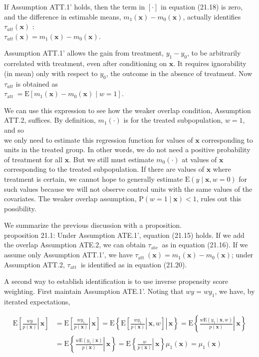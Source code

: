 \documentclass[10pt]{article}
\begin{document}
If Assumption ATT.1' holds, then the term in $[\cdot]$ in equation (21.18) is zero, and the difference in estimable means, $m_{1}(\mathbf{x})-m_{0}(\mathbf{x})$, actually identifies $\tau_{a t t}(\mathbf{x})$ :\\
$\tau_{a t t}(\mathbf{x})=m_{1}(\mathbf{x})-m_{0}(\mathbf{x})$.

Assumption ATT.1' allows the gain from treatment, $y_{1}-y_{0}$, to be arbitrarily correlated with treatment, even after conditioning on $\mathbf{x}$. It requires ignorability (in mean) only with respect to $y_{0}$, the outcome in the absence of treatment. Now $\tau_{a t t}$ is obtained as\\
$\tau_{\text {att }}=\mathrm{E}\left[m_{1}(\mathbf{x})-m_{0}(\mathbf{x}) \mid w=1\right]$.

We can use this expression to see how the weaker overlap condition, Assumption ATT.2, suffices. By definition, $m_{1}(\cdot)$ is for the treated subpopulation, $w=1$, and so\\
we only need to estimate this regression function for values of $\mathbf{x}$ corresponding to units in the treated group. In other words, we do not need a positive probability of treatment for all $\mathbf{x}$. But we still must estimate $m_{0}(\cdot)$ at values of $\mathbf{x}$ corresponding to the treated subpopulation. If there are values of $\mathbf{x}$ where treatment is certain, we cannot hope to generally estimate $\mathrm{E}(y \mid \mathbf{x}, w=0)$ for such values because we will not observe control units with the same values of the covariates. The weaker overlap assumption, $\mathrm{P}(w=1 \mid \mathbf{x})<1$, rules out this possibility.

We summarize the previous discussion with a proposition.\\
proposition 21.1: Under Assumption ATE.1', equation (21.15) holds. If we add the overlap Assumption ATE.2, we can obtain $\tau_{\text {ate }}$ as in equation (21.16). If we assume only Assumption ATT.1', we have $\tau_{\text {att }}(\mathbf{x})=m_{1}(\mathbf{x})-m_{0}(\mathbf{x})$; under Assumption ATT.2, $\tau_{\text {att }}$ is identified as in equation (21.20).

A second way to establish identification is to use inverse propensity score weighting. First maintain Assumption ATE.1'. Noting that $w y=w y_{1}$, we have, by iterated expectations,

$$
\begin{aligned}
\mathrm{E}\left[\left.\frac{w y}{p(\mathbf{x})} \right\rvert\, \mathbf{x}\right] & =\mathrm{E}\left[\left.\frac{w y_{1}}{p(\mathbf{x})} \right\rvert\, \mathbf{x}\right]=\mathrm{E}\left\{\left.\mathrm{E}\left[\left.\frac{w y_{1}}{p(\mathbf{x})} \right\rvert\, \mathbf{x}, w\right] \right\rvert\, \mathbf{x}\right\}=\mathrm{E}\left\{\left.\frac{w \mathrm{E}\left(y_{1} \mid \mathbf{x}, w\right)}{p(\mathbf{x})} \right\rvert\, \mathbf{x}\right\} \\
& =\mathrm{E}\left\{\left.\frac{w \mathrm{E}\left(y_{1} \mid \mathbf{x}\right)}{p(\mathbf{x})} \right\rvert\, \mathbf{x}\right\}=\mathrm{E}\left\{\left.\frac{w}{p(\mathbf{x})} \right\rvert\, \mathbf{x}\right\} \mu_{1}(\mathbf{x})=\mu_{1}(\mathbf{x})
\end{aligned}
$$
\end{document}
